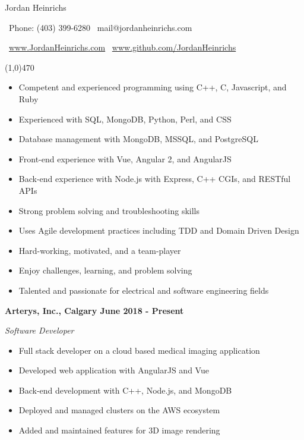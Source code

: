 \documentclass[12pt]{article}
\begin{document}
\centerline{{\Huge \sc Jordan Heinrichs}}
\medskip
\centerline{\textbullet\ Phone: (403) 399-6280 \hspace{5pt} \textbullet\ mail@jordanheinrichs.com}
\centerline{\textbullet\ \url{www.JordanHeinrichs.com}  \hspace{5pt} \textbullet\ \url{www.github.com/JordanHeinrichs}}
\noindent
\line(1,0){470}\\

\bigskip
{}
\medskip

\begin{itemize}
\item Competent and experienced programming using C++, C, Javascript, and Ruby
\item Experienced with SQL, MongoDB, Python, Perl, and CSS
\item Database management with MongoDB, MSSQL, and PostgreSQL
\item Front-end experience with Vue, Angular 2, and AngularJS
\item Back-end experience with Node.js with Express, C++ CGIs, and RESTful APIs
\item Strong problem solving and troubleshooting skills
\item Uses Agile development practices including TDD and Domain Driven Design
\item Hard-working, motivated, and a team-player
\item Enjoy challenges, learning, and problem solving
\item Talented and passionate for electrical and software engineering fields
\end{itemize}
\noindent

\bigskip
{}
\medskip

\noindent \centerline{ \bf Arterys, Inc., Calgary \hfill June 2018 - Present}
\indent \emph{ Software Developer }
\begin{itemize}
  \item Full stack developer on a cloud based medical imaging application
  \item Developed web application with AngularJS and Vue
  \item Back-end development with C++, Node.js, and MongoDB
  \item Deployed and managed clusters on the AWS ecosystem
  \item Added and maintained features for 3D image rendering
\end{itemize}
\end{document}
